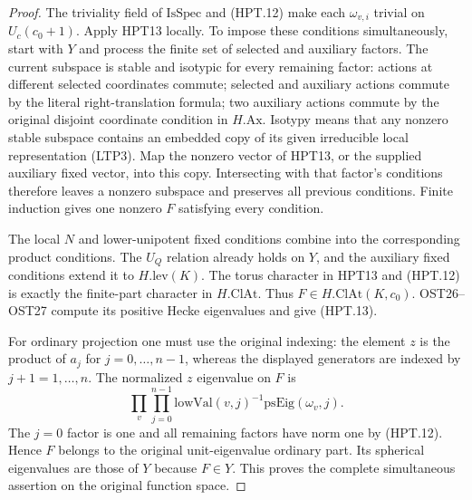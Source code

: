 \documentclass[11pt,a4paper]{article}
\numberwithin{equation}{section}
\theoremstyle{remark}\newtheorem{remark}[theorem]{Remark}
\begin{document}
\begin{proof}
The triviality field of $\mathrm{IsSpec}$ and (HPT.12) make each
$\omega_{v,i}$ trivial on $U_c(c_0+1)$.  Apply HPT13 locally.
To impose these conditions simultaneously, start with $Y$ and
process the finite set of selected and auxiliary factors.  The
current subspace is stable and isotypic for every remaining factor:
actions at different selected coordinates commute; selected and
auxiliary actions commute by the literal right-translation
formula; two auxiliary actions commute by the original disjoint
coordinate condition in $H.\mathrm{Ax}$.  Isotypy means that any
nonzero stable subspace contains an embedded copy of its given
irreducible local representation (LTP3).  Map the nonzero vector
of HPT13, or the supplied auxiliary fixed vector, into this copy.
Intersecting with that factor's conditions therefore leaves a
nonzero subspace and preserves all previous conditions.  Finite
induction gives one nonzero $F$ satisfying every condition.

The local $N$ and lower-unipotent fixed conditions combine into
the corresponding product conditions.  The $U_Q$ relation already
holds on $Y$, and the auxiliary fixed conditions extend it to
$H.\mathrm{lev}(K)$.  The torus character in HPT13 and (HPT.12)
is exactly the finite-part character in $H.\mathrm{ClAt}$.
Thus $F\in H.\mathrm{ClAt}(K,c_0)$.  OST26--OST27 compute its
positive Hecke eigenvalues and give (HPT.13).

For ordinary projection one must use the original indexing:
the element $z$ is the product of $a_j$ for $j=0,\ldots,n-1$,
whereas the displayed generators are indexed by $j+1=1,\ldots,n$.
The normalized $z$ eigenvalue on $F$ is
\[
              \prod_v\prod_{j=0}^{n-1}
                  \mathrm{lowVal}(v,j)^{-1}\mathrm{psEig}(\omega_v,j).
\]
The $j=0$ factor is one and all remaining factors have norm one
by (HPT.12).  Hence $F$ belongs to the original unit-eigenvalue
ordinary part.  Its spherical eigenvalues are those of $Y$
because $F\in Y$.  This proves the complete simultaneous assertion
on the original function space.
\end{proof}

\end{document}
